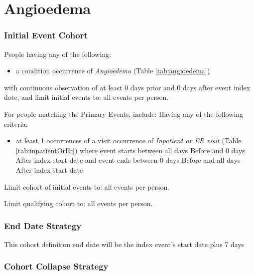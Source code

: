 \documentclass[11pt]{book}
\providecommand{\tightlist}{%
  \setlength{\itemsep}{0pt}\setlength{\parskip}{0pt}}
\theoremstyle{definition}
\theoremstyle{definition}
\theoremstyle{definition}
\theoremstyle{remark}
\begin{document}
\section{Angioedema}\label{Angioedema}

\subsubsection*{Initial Event Cohort}\label{initial-event-cohort-3}

People having any of the following:

\begin{itemize}
\tightlist
\item
  a condition occurrence of \emph{Angioedema} (Table
  \ref{tab:angioedema})
\end{itemize}

with continuous observation of at least 0 days prior and 0 days after
event index date, and limit initial events to: all events per person.

For people matching the Primary Events, include: Having any of the
following criteria:

\begin{itemize}
\tightlist
\item
  at least 1 occurrences of a visit occurrence of \emph{Inpatient or ER
  visit} (Table \ref{tab:inpatientOrEr}) where event starts between all
  days Before and 0 days After index start date and event ends between 0
  days Before and all days After index start date
\end{itemize}

Limit cohort of initial events to: all events per person.

Limit qualifying cohort to: all events per person.

\subsubsection*{End Date Strategy}\label{end-date-strategy-3}

This cohort definition end date will be the index event's start date
plus 7 days

\subsubsection*{Cohort Collapse
Strategy}\label{cohort-collapse-strategy-3}
\end{document}
